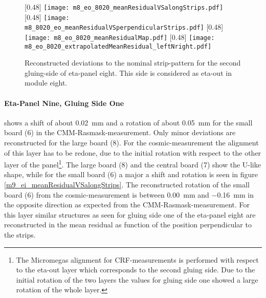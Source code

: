\documentclass[
twoside,            %
BCOR1.4cm,          %
10pt,               %
headings=normal,    %
headsepline,        %
clearplainpage,		%
final,              %
div=14,
open=right,
bibliography=toc
]{scrreprt}
\begin{document}
\begin{figure}[!h]
	\centering
	[0.48\textwidth]
	{\texttt{[image: m8\_eo\_8020\_meanResidualVSalongStrips.pdf]}}
	\hfill
	[0.48\textwidth]
	{\texttt{[image: m8\_8020\_eo\_meanResidualVSperpendicularStrips.pdf]}}
	\hfill
	[0.48\textwidth]
	{\texttt{[image: m8\_eo\_8020\_meanResidualMap.pdf]}}
	\hfill
	[0.48\textwidth]
	{\texttt{[image: m8\_eo\_8020\_extrapolatedMeanResidual\_leftNright.pdf]}}
	\vspace{-2mm}
	\caption{
		Reconstructed deviations to the nominal strip-pattern for the second gluing-side of eta-panel eight.
		This side is considered as eta-out in module eight.
	}
	\label{eta8gs2} 
\end{figure}

\newpage

\paragraph{Eta-Panel Nine, Gluing Side One}

shows a shift of about \SI{0.02}{mm} and a rotation of about \SI{0.05}{mm} for the small board (6) in the CMM-Rasmask-measurement.
Only minor deviations are reconstructed for the large board (8).
For the cosmic-measurement the alignment of this layer has to be redone, due to the initial rotation with respect to the other layer of the panel\footnote{
	The Micromegas alignment for CRF-measurements is performed with respect to the eta-out layer which corresponds to the second gluing side.
	Due to the initial rotation of the two layers the values for gluing side one showed a large rotation of the whole layer.
}.
The large board (8) and the central board (7) show the U-like shape, while for the small board (6) a major a shift and rotation is seen in figure \ref{m9_ei_meanResidualVSalongStrips}.
The reconstructed rotation of the small board (6) from the cosmic-measurement is between \SI{0.00}{mm} and \SI{-0.16}{mm} in the opposite direction as expected from the CMM-Rasmask-measurement.
For this layer similar structures as seen for gluing side one of the eta-panel eight are reconstructed in the mean residual as function of the position perpendicular to the strips.
\end{document}
